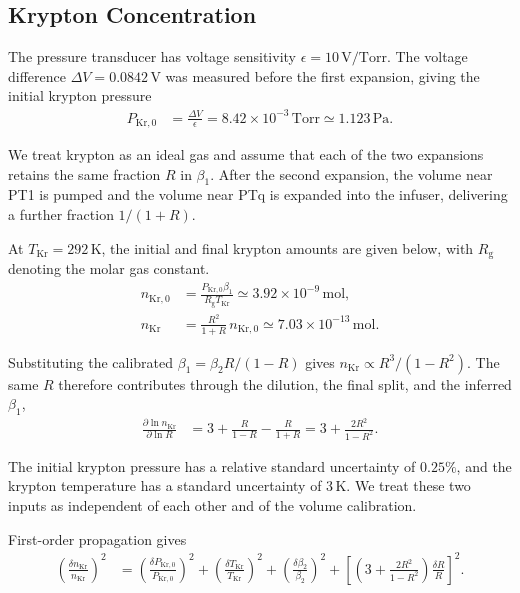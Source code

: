 \documentclass{article}
\begin{document}
\subsection{Krypton Concentration}

The pressure transducer has voltage sensitivity $\epsilon=10\,\mathrm{V/Torr}$. The voltage difference $\Delta V=0.0842\,\mathrm V$ was measured before the first expansion, giving the initial krypton pressure
\begin{align}
    P_{\mathrm{Kr},0} &= \frac{\Delta V}{\epsilon} = 8.42\times10^{-3}\,\mathrm{Torr} \simeq 1.123\,\mathrm{Pa}.
\end{align}

\begin{keyidea}
    We treat krypton as an ideal gas and assume that each of the two expansions retains the same fraction $R$ in $\beta_1$. After the second expansion, the volume near PT1 is pumped and the volume near PTq is expanded into the infuser, delivering a further fraction $1/(1+R)$.
\end{keyidea}

At $T_\mathrm{Kr}=292\,\mathrm K$, the initial and final krypton amounts are given below, with $R_\mathrm g$ denoting the molar gas constant.
\begin{align}
    n_{\mathrm{Kr},0} &= \frac{P_{\mathrm{Kr},0}\beta_1}{R_\mathrm g T_\mathrm{Kr}} \simeq 3.92\times10^{-9}\,\mathrm{mol}, \\
    n_\mathrm{Kr} &= \frac{R^2}{1+R}\, n_{\mathrm{Kr},0} \simeq 7.03\times10^{-13}\,\mathrm{mol}.
\end{align}

Substituting the calibrated $\beta_1=\beta_2R/(1-R)$ gives $n_\mathrm{Kr}\propto R^3/(1-R^2)$. The same $R$ therefore contributes through the dilution, the final split, and the inferred $\beta_1$,
\begin{align}
    \frac{\partial\ln n_\mathrm{Kr}}{\partial\ln R} &= 3+\frac{R}{1-R}-\frac{R}{1+R}=3+\frac{2R^2}{1-R^2}.
\end{align}

\begin{keyidea}
    The initial krypton pressure has a relative standard uncertainty of $0.25\%$, and the krypton temperature has a standard uncertainty of $3\,\mathrm K$. We treat these two inputs as independent of each other and of the volume calibration.
\end{keyidea}

First-order propagation gives
\begin{align}
    \left(\frac{\delta n_\mathrm{Kr}}{n_\mathrm{Kr}}\right)^2 &= \left(\frac{\delta P_{\mathrm{Kr},0}}{P_{\mathrm{Kr},0}}\right)^2 + \left(\frac{\delta T_\mathrm{Kr}}{T_\mathrm{Kr}}\right)^2 + \left(\frac{\delta\beta_2}{\beta_2}\right)^2 + \left[\left(3+\frac{2R^2}{1-R^2}\right)\frac{\delta R}{R}\right]^2.
\end{align}
\end{document}
